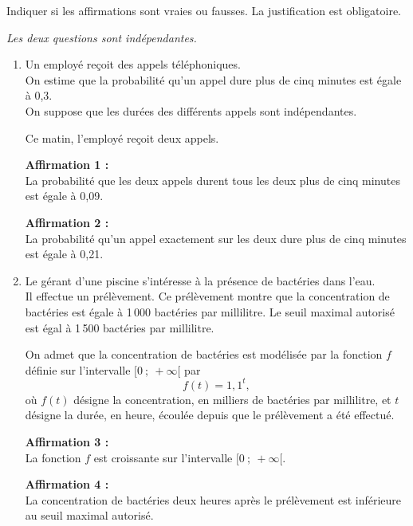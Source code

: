 Indiquer si les affirmations sont vraies ou fausses. La justification est obligatoire.

\centering \textit{Les deux questions sont indépendantes.}

\begin{enumerate}
\item Un employé reçoit des appels téléphoniques. \\
On estime que la probabilité qu'un appel dure plus de cinq minutes est égale à 0,3. \\
On suppose que les durées des différents appels sont indépendantes.

Ce matin, l'employé reçoit deux appels.

\textbf{Affirmation 1 :} \\
La probabilité que les deux appels durent tous les deux plus de cinq minutes est égale à 0,09.

\textbf{Affirmation 2 :} \\
La probabilité qu'un appel exactement sur les deux dure plus de cinq minutes est égale à 0,21.

\bigskip

\item Le gérant d'une piscine s'intéresse à la présence de bactéries dans l'eau. \\
Il effectue un prélèvement. Ce prélèvement montre que la concentration de bactéries est égale à 1\,000 bactéries par millilitre. Le seuil maximal autorisé est égal à 1\,500 bactéries par millilitre.

On admet que la concentration de bactéries est modélisée par la fonction $f$ définie sur l'intervalle $[0~;~+\infty[$ par
\[ f(t) = 1,1^t, \]
où $f(t)$ désigne la concentration, en milliers de bactéries par millilitre, et $t$ désigne la durée, en heure, écoulée depuis que le prélèvement a été effectué.

\textbf{Affirmation 3 :} \\
La fonction $f$ est croissante sur l'intervalle $[0~;~+\infty[$.

\textbf{Affirmation 4 :} \\
La concentration de bactéries deux heures après le prélèvement est inférieure au seuil maximal autorisé.
\end{enumerate}
